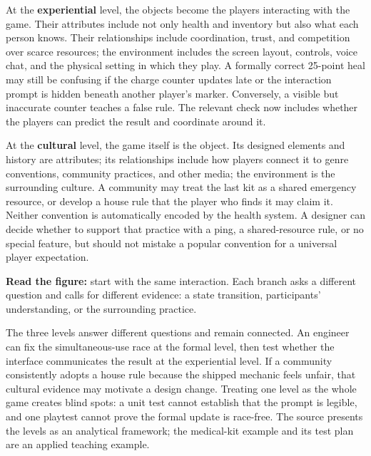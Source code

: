 At the \textbf{experiential} level, the objects become the players interacting with the game. Their attributes include not only health and inventory but also what each person knows. Their relationships include coordination, trust, and competition over scarce resources; the environment includes the screen layout, controls, voice chat, and the physical setting in which they play. A formally correct 25-point heal may still be confusing if the charge counter updates late or the interaction prompt is hidden beneath another player's marker. Conversely, a visible but inaccurate counter teaches a false rule. The relevant check now includes whether the players can predict the result and coordinate around it.

At the \textbf{cultural} level, the game itself is the object. Its designed elements and history are attributes; its relationships include how players connect it to genre conventions, community practices, and other media; the environment is the surrounding culture. A community may treat the last kit as a shared emergency resource, or develop a house rule that the player who finds it may claim it. Neither convention is automatically encoded by the health system. A designer can decide whether to support that practice with a ping, a shared-resource rule, or no special feature, but should not mistake a popular convention for a universal player expectation.


\textbf{Read the figure:} start with the same interaction. Each branch asks a different question and calls for different evidence: a state transition, participants' understanding, or the surrounding practice.

The three levels answer different questions and remain connected. An engineer can fix the simultaneous-use race at the formal level, then test whether the interface communicates the result at the experiential level. If a community consistently adopts a house rule because the shipped mechanic feels unfair, that cultural evidence may motivate a design change. Treating one level as the whole game creates blind spots: a unit test cannot establish that the prompt is legible, and one playtest cannot prove the formal update is race-free. The source presents the levels as an analytical framework; the medical-kit example and its test plan are an applied teaching example.

